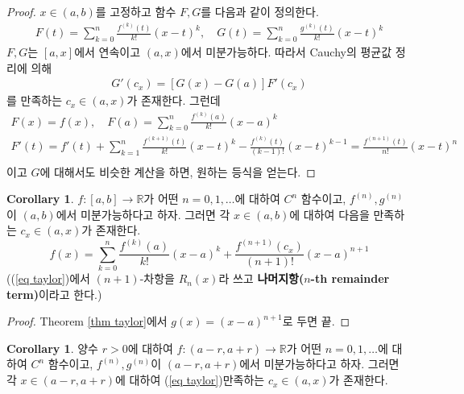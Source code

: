 \documentclass[12pt]{article}
\theoremstyle{definition}
\newtheorem{cor}[thm]{Corollary}
\def\RR{\mathbb{R}}
\begin{document}
\begin{proof}
	\(x \in (a, b)\)를 고정하고 함수 \(F, G\)를 다음과 같이 정의한다.
	\begin{gather*}
		F(t) = \sum_{k=0}^n \frac{f^{(k)}(t)}{k!} (x - t)^k, \quad G(t) = \sum_{k=0}^n \frac{g^{(k)}(t)}{k!} (x - t)^k
	\end{gather*}
	\(F, G\)는 \([a, x]\)에서 연속이고 \((a, x)\)에서 미분가능하다. 따라서 Cauchy의 평균값 정리에 의해
	\begin{gather*}
		[F(x) - F(a)]G'(c_x) = [G(x) - G(a)]F'(c_x)
	\end{gather*}
	를 만족하는 \(c_x \in (a, x)\)가 존재한다. 그런데
	\begin{gather*}
		F(x) = f(x), \quad F(a) =  \sum_{k=0}^n \frac{f^{(k)}(a)}{k!} (x - a)^k\\
		F'(t) = f'(t) + \sum_{k=1}^n {\frac{f^{(k+1)}(t)}{k!}(x-t)^k - \frac{f^{(k)}(t)}{(k-1)!}(x-t)^{k-1}} = \frac{f^{(n+1)}(t)}{n!} (x-t)^n\\
	\end{gather*}
	이고 \(G\)에 대해서도 비슷한 계산을 하면, 원하는 등식을 얻는다.
\end{proof}

\begin{cor}
	\(f: [a, b] \rightarrow \RR\)가 어떤 \(n = 0, 1, \ldots\)에 대하여 \(C^n\) 함수이고, \(f^{(n)}, g^{(n)}\)이 \((a, b)\)에서 미분가능하다고 하자. 그러면 각 \(x \in (a, b)\)에 대하여 다음을 만족하는 \(c_x \in (a, x)\)가 존재한다.
	\begin{equation} \label{eq taylor}
		f(x) = \sum_{k=0}^n \frac{f^{(k)}(a)}{k!} (x - a)^k + \frac{f^{(n+1)}(c_x)}{(n+1)!} (x-a)^{n+1}
	\end{equation}
	((\ref{eq taylor})에서 \((n+1)\)-차항을 \(R_{n}(x)\)라 쓰고 \textbf{나머지항(\(n\)-th remainder term)}이라고 한다.)
\end{cor}
\begin{proof}
	Theorem \ref{thm taylor}에서 \(g(x) = (x-a)^{n+1}\)로 두면 끝.
\end{proof}

\begin{cor}
	양수 \(r > 0\)에 대하여 \(f: (a-r, a+r) \rightarrow \RR\)가 어떤 \(n = 0, 1, \ldots\)에 대하여 \(C^n\) 함수이고, \(f^{(n)}, g^{(n)}\)이 \((a-r, a+r)\)에서 미분가능하다고 하자. 그러면  각 \(x \in (a-r, a+r)\)에 대하여 (\ref{eq taylor})\을 만족하는 \(c_x \in (a, x)\)가 존재한다.
\end{cor}
\end{document}
